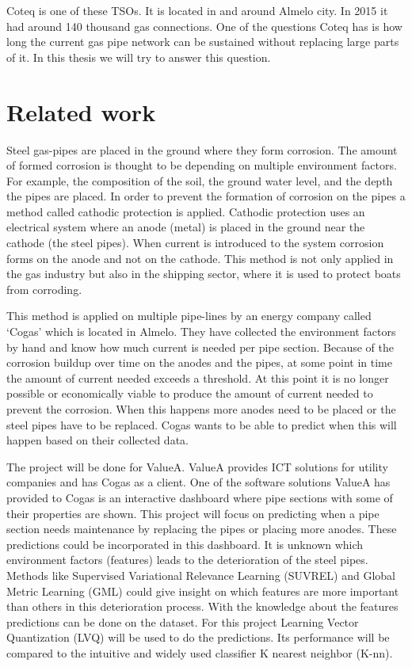 Coteq is one of these TSOs. It is located in and around Almelo city. In 2015 it had around 140 thousand gas connections.  One of the questions Coteq has is how long the current gas pipe network can be sustained without replacing large parts of it. In this thesis we will try to answer this question.


\section{Related work}



Steel gas-pipes are placed in the ground where they form corrosion. The amount of formed corrosion is thought to be depending on multiple environment factors. For example, the composition of the soil, the ground water level, and the depth the pipes are placed. In order to prevent the formation of corrosion on the pipes a method called cathodic protection is applied. Cathodic protection uses an electrical system where an anode (metal) is placed in the ground near the cathode (the steel pipes). When current is introduced to the system corrosion forms on the anode and not on the cathode. This method is not only applied in the gas industry but also in the shipping sector, where it is used to protect boats from corroding. 

This method is applied on multiple pipe-lines by an energy company called `Cogas' which is located in Almelo. They have collected the environment factors by hand and know how much current is needed per pipe section. Because of the corrosion buildup over time on the anodes and the pipes, at some point in time the amount of current needed exceeds a threshold. At this point it is no longer possible or economically viable to produce the amount of current needed to prevent the corrosion. When this happens more anodes need to be placed or the steel pipes have to be replaced. Cogas wants to be able to predict when this will happen based on their collected data.

The project will be done for ValueA. ValueA provides ICT solutions for utility companies and has Cogas as a client. One of the software solutions ValueA has provided to Cogas is an interactive dashboard where pipe sections with some of their properties are shown. This project will focus on predicting when a pipe section needs maintenance by replacing the pipes or placing more anodes. These predictions could be incorporated in this dashboard.
It is unknown which environment factors (features) leads to the deterioration of the steel pipes. Methods like Supervised Variational Relevance Learning (SUVREL) and Global Metric Learning (GML) could give insight on which features are more important than others in this deterioration process. With the knowledge about the features predictions can be done on the dataset. For this project Learning Vector Quantization (LVQ) will be used to do the predictions. Its performance will be compared to the intuitive and widely used classifier K nearest neighbor (K-nn).

